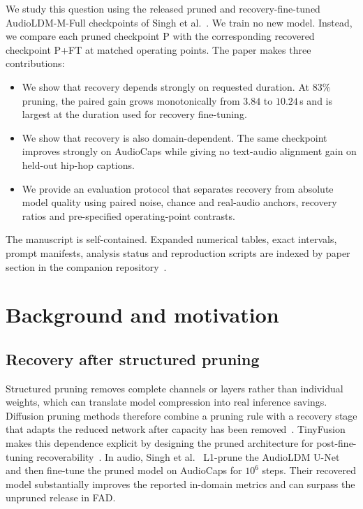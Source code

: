 \documentclass{article}
\newcommand{\PFT}{P{+}FT}
\begin{document}
We study this question using the released pruned and recovery-fine-tuned AudioLDM-M-Full checkpoints of Singh et al.~\cite{singh2026pruning}. We train no new model. Instead, we compare each pruned checkpoint P with the corresponding recovered checkpoint \PFT{} at matched operating points. The paper makes three contributions:
\begin{itemize}\itemsep1.5pt \parskip0pt 
\item We show that recovery depends strongly on requested duration. At $83\%$ pruning, the paired gain grows monotonically from $3.84$ to $10.24$\,s and is largest at the duration used for recovery fine-tuning.
\item We show that recovery is also domain-dependent. The same checkpoint improves strongly on AudioCaps while giving no text-audio alignment gain on held-out hip-hop captions.
\item We provide an evaluation protocol that separates recovery from absolute model quality using paired noise, chance and real-audio anchors, recovery ratios and pre-specified operating-point contrasts.
\end{itemize}
The manuscript is self-contained. Expanded numerical tables, exact intervals, prompt manifests, analysis status and reproduction scripts are indexed by paper section in the companion repository~\cite{bibbo2026repo}.

\section{Background and motivation}
\subsection{Recovery after structured pruning}
Structured pruning removes complete channels or layers rather than individual weights, which can translate model compression into real inference savings. Diffusion pruning methods therefore combine a pruning rule with a recovery stage that adapts the reduced network after capacity has been removed~\cite{fang2023diffpruning,kim2024bksdm,fang2025tinyfusion}. TinyFusion makes this dependence explicit by designing the pruned architecture for post-fine-tuning recoverability~\cite{fang2025tinyfusion}. In audio, Singh et al.~\cite{singh2026pruning} L1-prune the AudioLDM U-Net and then fine-tune the pruned model on AudioCaps for $10^{6}$ steps. Their recovered model substantially improves the reported in-domain metrics and can surpass the unpruned release in FAD.
\end{document}

